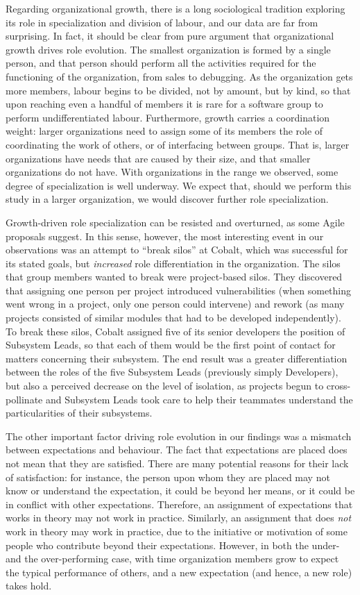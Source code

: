 \documentclass[10pt, conference, compsocconf]{IEEEtran}
\begin{document}
Regarding organizational growth, there is a long sociological tradition exploring its role in specialization and division of labour, and our data are far from surprising. In fact, it should be clear from pure argument that organizational growth drives role evolution. The smallest organization is formed by a single person, and that person should perform all the activities required for the functioning of the organization, from sales to debugging. As the organization gets more members, labour begins to be divided, not by amount, but by kind, so that upon reaching even a handful of members it is rare for a software group to perform undifferentiated labour. Furthermore, growth carries a coordination weight: larger organizations need to assign some of its members the role of coordinating the work of others, or of interfacing between groups. That is, larger organizations have needs that are caused by their size, and that smaller organizations do not have. With organizations in the range we observed, some degree of specialization is well underway. We expect that, should we perform this study in a larger organization, we would discover further role specialization.

Growth-driven role specialization can be resisted and overturned, as some Agile proposals suggest. In this sense, however, the most interesting event in our observations was an attempt to ``break silos'' at Cobalt, which was successful for its stated goals, but \emph{increased} role differentiation in the organization. The silos that group members wanted to break were project-based silos. They discovered that assigning one person per project introduced vulnerabilities (when something went wrong in a project, only one person could intervene) and rework (as many projects consisted of similar modules that had to be developed independently). To break these silos, Cobalt assigned five of its senior developers the position of Subsystem Leads, so that each of them would be the first point of contact for matters concerning their subsystem. The end result was a greater differentiation between the roles of the five Subsystem Leads (previously simply Developers), but also a perceived decrease on the level of isolation, as projects begun to cross-pollinate and Subsystem Leads took care to help their teammates understand the particularities of their subsystems.

The other important factor driving role evolution in our findings was a mismatch between expectations and behaviour. The fact that expectations are placed does not mean that they are satisfied. There are many potential reasons for their lack of satisfaction: for instance, the person upon whom they are placed may not know or understand the expectation, it could be beyond her means, or it could be in conflict with other expectations. Therefore, an assignment of expectations that works in theory may not work in practice. Similarly, an assignment that does \emph{not} work in theory may work in practice, due to the initiative or motivation of some people who contribute beyond their expectations. However, in both the under- and the over-performing case, with time organization members grow to expect the typical performance of others, and a new expectation (and hence, a new role) takes hold.
\end{document}
